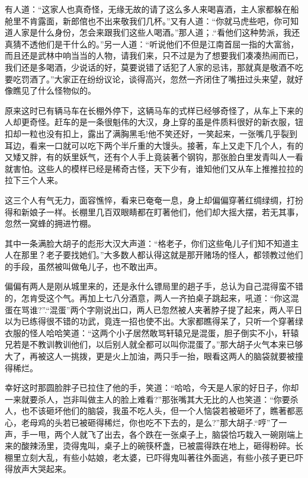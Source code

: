 \documentclass[12pt,oneside]{book}
\begin{document}
有人道：``这家人也真奇怪，无缘无故的请了这么多人来喝喜酒，主人家都躲在船舱里不肯露面，新郎倌也不出来敬我们几杯。''又有人道：``你就马虎些吧，你可知道人家是什么身份，怎会来跟我们这些人喝酒。''那人道；.``看他们这种势派，我还真猜不透他们是干什么的。''另一人道：``听说他们不但是江南首屈一指的大富翁，而且还是武林中响当当的人物，请我们来，只不过是为了想要我们凑凑热闹而已，我们还是多喝酒，少说话的好，莫要说错了话犯了人家的忌讳，那就真是敬酒不吃要吃罚酒了。''大家正在纷纷议论，谈得高兴，忽然一齐闭住了嘴扭过头来望，就好像瞧见了什么怪物似的。

原来这时已有辆马车在长棚外停下，这辆马车的式样已经够奇怪了，从车上下来的人却更奇怪。赶车的是一条很魁伟的大汉，身上穿的虽是件质料很好的新衣服，钮扣却一粒也没有扣上，露出了满胸黑毛!他不笑还好，一笑起来，一张嘴几乎裂到耳边，看来一口就可以吃下两个半斤重的大馒头。接著，车上又走下几个人，有的又矮又胖，有的妖里妖气，还有个人手上竟装著个钢钩，那张脸白里发青叫人一看就害怕。这些人的模样已经是稀奇古怪，天下少有，谁知他们又从车上推推拉拉的拉下三个人来。

这三个人有气无力，面容憔悴，看来已奄奄一息，身上却偏偏穿著红绸绿绸，打扮得和新娘子一样。长棚里几百双眼睛都在盯著他们，他们却大摇大摆，若无其事，忽然一窝蜂的拥进竹棚。

其中一条满脸大胡子的彪形大汉大声道：``格老子，你们这些龟儿子们知不知道主人在那里？老子要找她们。''大多数人都认得这就是那开赌场的怪人，都领教过他们的手段，虽然被叫做龟儿子，也不敢出声。

偏偏有两人是刚从城里来的，还是永什么镖局里的趟子手，总认为自己混得蛮不错的，怎肯受这个气。再加上七八分酒意，两人一齐拍桌子跳起来，吼道：``你这混蛋在骂谁?''.``混蛋''两个字刚说出口，两人已忽然被人夹著脖子提了起来，两人平日以为已练得很不错的功武，竟连一招也使不出。大家都瞧得呆了，只听一个穿著绿衣服的怪人哈哈笑道：``这两个小子居然敢骂轩辕兄是混蛋，胆子倒实不小，轩辕兄若是不教训教训他们，以后别人就全都可以叫你混蛋了。''那大胡子火气本来已够大了，再被这人一挑拨，更是火上加油，两只手一抬，眼看这两人的脑袋就要被撞得稀烂。

幸好这时那圆脸胖子已拉住了他的手，笑道：``哈哈，今天是人家的好日子，你却一来就要杀人，岂非叫做主人的脸上难看?''那张嘴其大无比的人也笑道：``你要杀人，也不该砸坏他们的脑袋，我虽不吃人头，但一个人恼袋若被砸坏了，瞧著都恶心，老母鸡的头若已被砸得稀烂，你也吃不下去的，是么?''那大胡子.``哼''了一声，手一甩，两个人就飞了出去，各个跌在一张桌子上，脑袋恰巧栽入一碗刚端上来的酸辣汤里，烫得鬼叫，桌子上的碗筷杯盏，已被震得跌在地上，砸得粉碎。长棚里立刻大乱，有些小姑娘，老太婆，已吓得鬼叫著往外面逃，有些小孩子更已吓得放声大哭起来。
\end{document}
